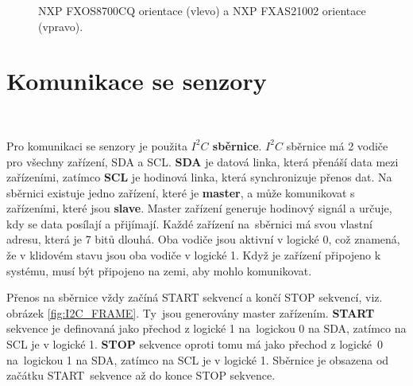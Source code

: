 \begin{figure}[ht]
	\centering
	\hfill
	\caption{NXP FXOS8700CQ orientace \cite{FXOS8700CQ} (vlevo) a NXP FXAS21002 orientace \cite{FXAS21002} (vpravo).}
\end{figure}

\section{Komunikace se senzory}\

Pro komunikaci se senzory je použita \textbf{$I^2C$ sběrnice}. $I^2C$ sběrnice má 2
vodiče pro všechny zařízení, SDA a SCL. \textbf{SDA} je datová linka, která
přenáší data mezi zařízeními, zatímco \textbf{SCL} je hodinová linka, která
synchronizuje přenos dat. Na sběrnici existuje jedno zařízení, které je
\textbf{master}, a může komunikovat s zařízeními, které jsou \textbf{slave}. Master
zařízení generuje hodinový signál a určuje, kdy se data posílají a přijímají. Každé
zařízení na~sběrnici má svou vlastní adresu, která je 7 bitů dlouhá. Oba vodiče jsou
aktivní v logické 0, což znamená, že v klidovém stavu jsou oba vodiče v logické 1.
Když je zařízení připojeno k systému, musí být připojeno na zemi, aby mohlo
komunikovat.

Přenos na sběrnice vždy začíná START sekvencí a končí STOP sekvencí, viz. obrázek
\ref{fig:I2C_FRAME}. Ty~jsou generovány master zařízením. \textbf{START} sekvence je
definovaná jako přechod z logické 1 na~logickou 0 na SDA, zatímco na SCL je v
logické 1. \textbf{STOP} sekvence oproti tomu má jako přechod z logické~0
na~logickou 1 na SDA, zatímco na SCL je v logické 1. Sběrnice je obsazena od začátku
START~sekvence až do konce STOP sekvence.

